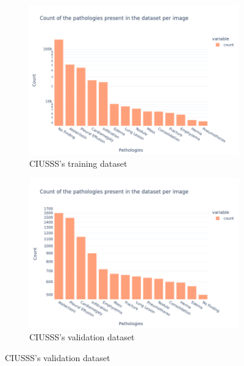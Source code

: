 \documentclass[11pt]{article}
\begin{document}
    \begin{figure}[h!]
         \centering
         \begin{subfigure}[b]{0.48\linewidth}
             \centering
             \includegraphics[width=\linewidth]{plots/histogram_ciusss_train}
             \caption{CIUSSS's training dataset}
             \vspace{4ex}
             \label{fig:histogram_ciusss_train}
         \end{subfigure}
         \hfill
         \begin{subfigure}[b]{0.48\linewidth}
             \centering
             \includegraphics[width=\linewidth]{plots/histogram_ciusss_valid}
             \caption{CIUSSS's validation dataset}
             \vspace{4ex}
             \label{fig:histogram_ciusss_valid}
         \end{subfigure}



\end{figure}
\end{document}
